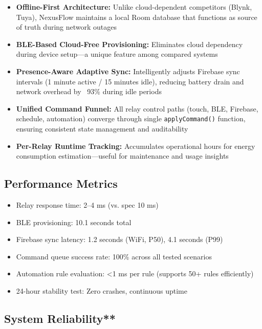 \begin{itemize}
    \item \textbf{Offline-First Architecture:} Unlike cloud-dependent competitors (Blynk, Tuya), NexusFlow maintains a local Room database that functions as source of truth during network outages
    
    \item \textbf{BLE-Based Cloud-Free Provisioning:} Eliminates cloud dependency during device setup—a unique feature among compared systems
    
    \item \textbf{Presence-Aware Adaptive Sync:} Intelligently adjusts Firebase sync intervals (1 minute active / 15 minutes idle), reducing battery drain and network overhead by ~93\% during idle periods
    
    \item \textbf{Unified Command Funnel:} All relay control paths (touch, BLE, Firebase, schedule, automation) converge through single \texttt{applyCommand()} function, ensuring consistent state management and auditability
    
    \item \textbf{Per-Relay Runtime Tracking:} Accumulates operational hours for energy consumption estimation—useful for maintenance and usage insights
\end{itemize}

\subsection{Performance Metrics}

\begin{itemize}
    \item Relay response time: 2–4 ms (vs. spec 10 ms)
    \item BLE provisioning: 10.1 seconds total
    \item Firebase sync latency: 1.2 seconds (WiFi, P50), 4.1 seconds (P99)
    \item Command queue success rate: 100\% across all tested scenarios
    \item Automation rule evaluation: <1 ms per rule (supports 50+ rules efficiently)
    \item 24-hour stability test: Zero crashes, continuous uptime
\end{itemize}

\subsection{System Reliability**}

